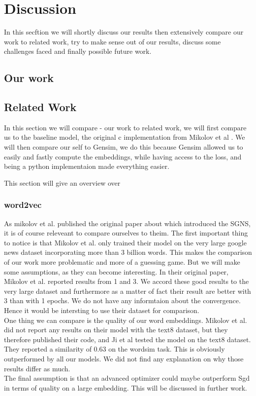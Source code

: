 \chapter{Discussion}\label{chap:discussion}



In this secftion we will shortly discuss our results then extensively compare our work to related work, try to make sense out of our results, discuss some challenges faced and finally possible future work. 

\section{Our work}

\section{Related Work}
In this section we will compare - our work to related work, we will first compare us to the baseline model, the original c implementation from Mikolov et al \cite{Mikolov}. We will then compare our self to Gensim, we do this because Gensim allowed us to easily and fastly compute the embeddings, while having access to the loss, and being a python implementaion made everything easier. 

This section will give an overview over 





\subsection{word2vec}

As mikolov et al. published the original paper about which introduced the SGNS, it is of course releveant to compare ourselves to theim. The first important thing to notice is that Mikolov et al. only trained their model on the very large google news dataset incorporating more than 3 billion words. This makes the comparison of our work more problematic and more of a guessing game. But we will make some assumptions, as they can become interesting. 
In their original paper, Mikolov et al. reported results from 1 and 3. We accord these good results to the very large dataset  and furthermore as a matter of fact their result are better with 3 than with 1 epochs. We do not have any informtaion about the convergence. Hence it would be intersting to use their dataset for comparison. \\
One thing we can compare is the quality of our word embeddings. Mikolov et al. did not report any results on their model with the text8 dataset, but they therefore published their code, and Ji et al \cite{intel} tested the model on the text8 dataset. They reported a similarity of 0.63 on the wordsim task. This is obviously outperformed by all our models. We did not find any explanation on why those results differ as much. \\
The final assumption is that an advanced optimizer could maybe outperform Sgd in terms of quality on a large embedding. This will be discussed in further work.
 


